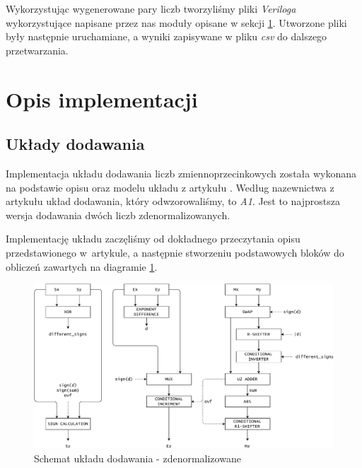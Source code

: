 \documentclass{article}
\begin{document}
Wykorzystując wygenerowane pary liczb tworzyliśmy pliki \emph{Veriloga} wykorzystujące napisane przez nas moduły opisane w sekcji \ref{sec:implementacja}.
Utworzone pliki były następnie uruchamiane, a wyniki zapisywane w pliku \emph{csv} do dalszego przetwarzania.


\section{Opis implementacji}\label{sec:implementacja}

\subsection{Układy dodawania}
Implementacja układu dodawania liczb zmiennoprzecinkowych została wykonana na podstawie opisu oraz 
modelu układu z artykułu \cite{art:old}.
Według nazewnictwa z artykułu układ dodawania, który odwzorowaliśmy, to \emph{A1}. 
Jest to najprostsza wersja dodawania dwóch liczb zdenormalizowanych.

Implementację układu zaczęliśmy od dokładnego przeczytania opisu przedstawionego w~artykule, a następnie stworzeniu podstawowych bloków do obliczeń zawartych na diagramie \ref{fig:diagram_add_denorm}.

\begin{figure}[H]
	\centering
	\includegraphics[width=\textwidth]{figures/diagram_add_denorm.pdf}
	\caption{Schemat układu dodawania - zdenormalizowane}
	\label{fig:diagram_add_denorm}
\end{figure}
\end{document}
